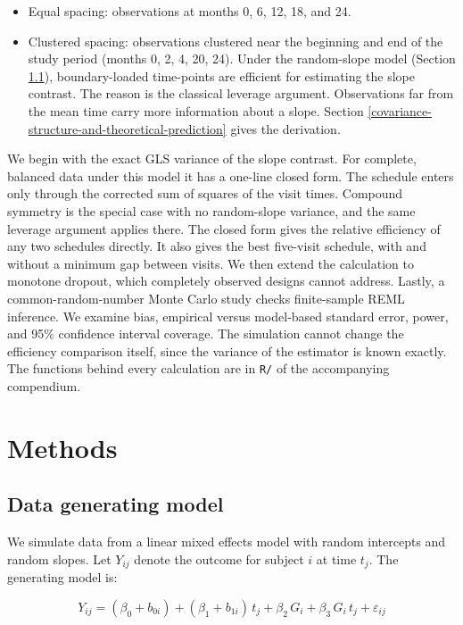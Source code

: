 \documentclass[
  11pt,
]{article}
\providecommand{\tightlist}{%
  \setlength{\itemsep}{0pt}\setlength{\parskip}{0pt}}
\begin{document}
\begin{itemize}
\tightlist
\item
  Equal spacing: observations at months 0, 6, 12, 18, and 24.
\item
  Clustered spacing: observations clustered near the beginning
  and end of the study period (months 0, 2, 4, 20, 24). Under the
  random-slope model (Section \ref{data-generating-model}),
  boundary-loaded time-points are efficient for estimating the
  slope contrast. The reason is the classical leverage argument.
  Observations far from the mean time carry more information
  about a slope. Section
  \ref{covariance-structure-and-theoretical-prediction} gives
  the derivation.
\end{itemize}

We begin with the exact GLS variance of the slope contrast. For
complete, balanced data under this model it has a one-line closed
form. The schedule enters only through the corrected sum of
squares of the visit times. Compound symmetry is the special case
with no random-slope variance, and the same leverage argument
applies there. The closed form gives the relative efficiency of
any two schedules directly. It also gives the best five-visit
schedule, with and without a minimum gap between visits. We then
extend the calculation to monotone dropout, which completely
observed designs cannot address. Lastly, a common-random-number
Monte Carlo study checks finite-sample REML inference. We examine
bias, empirical versus model-based standard error, power, and 95\%
confidence interval coverage. The simulation cannot change the
efficiency comparison itself, since the variance of the estimator
is known exactly. The functions behind every calculation are in
\texttt{R/} of the accompanying compendium.

\section{Methods}\label{methods}

\subsection{Data generating model}\label{data-generating-model}

We simulate data from a linear mixed effects model with random
intercepts and random slopes. Let \(Y_{ij}\) denote the outcome for
subject \(i\) at time \(t_j\). The generating model is:

\[Y_{ij} = (\beta_0 + b_{0i}) +
         (\beta_1 + b_{1i}) \, t_j +
         \beta_2 \, G_i +
         \beta_3 \, G_i \, t_j +
         \varepsilon_{ij}\]
\end{document}
